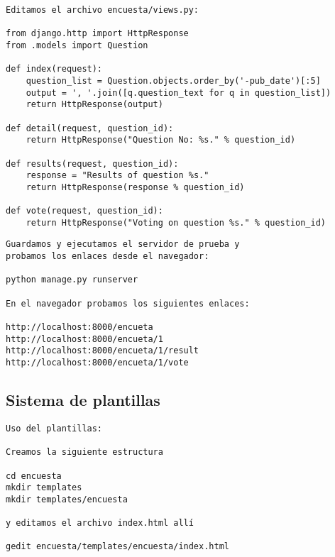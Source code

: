 \documentclass[xcolor=dvipsnames]{beamer}
\begin{document}
\begin{frame}[fragile]
\begin{verbatim}
Editamos el archivo encuesta/views.py:

from django.http import HttpResponse
from .models import Question

def index(request):
    question_list = Question.objects.order_by('-pub_date')[:5]
    output = ', '.join([q.question_text for q in question_list])
    return HttpResponse(output)

def detail(request, question_id):
    return HttpResponse("Question No: %s." % question_id)

def results(request, question_id):
    response = "Results of question %s." 
    return HttpResponse(response % question_id)

def vote(request, question_id):
    return HttpResponse("Voting on question %s." % question_id)
\end{verbatim}
\end{frame}

\begin{frame}[fragile]
\begin{verbatim}
Guardamos y ejecutamos el servidor de prueba y 
probamos los enlaces desde el navegador:

python manage.py runserver

En el navegador probamos los siguientes enlaces:

http://localhost:8000/encueta
http://localhost:8000/encueta/1
http://localhost:8000/encueta/1/result
http://localhost:8000/encueta/1/vote

\end{verbatim}
\end{frame}

\subsection{Sistema de plantillas}

\begin{frame}[fragile]
\begin{verbatim}
Uso del plantillas:

Creamos la siguiente estructura

cd encuesta
mkdir templates
mkdir templates/encuesta

y editamos el archivo index.html allí

gedit encuesta/templates/encuesta/index.html

\end{verbatim}
\end{frame}
\end{document}
